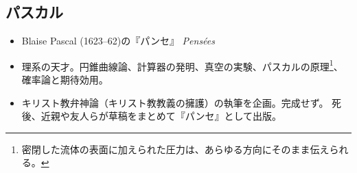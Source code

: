 \documentclass[uplatex,dvipdfmx]{jsarticle}
\begin{document}
\subsection{パスカル}



\begin{itemize}
\item Blaise Pascal (1623--62)の『パンセ』 \emph{Pens{\'e}es}

\item 理系の天才。円錐曲線論、計算器の発明、真空の実験、パスカルの原理\footnote{密閉した流体の表面に加えられた圧力は、あらゆる方向にそのまま伝えられる。}、確率論と期待効用。


\item キリスト教弁神論（キリスト教教義の擁護）の執筆を企画。完成せず。
死後、近親や友人らが草稿をまとめて『パンセ』として出版。

\end{itemize}

\ifx\mybook\undefined
  

\end{document}
